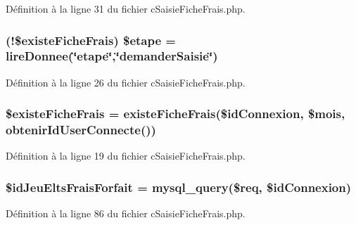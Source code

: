 Définition à la ligne 31 du fichier c\-Saisie\-Fiche\-Frais.\-php.

\hypertarget{c_saisie_fiche_frais_8php_af8e2930c82415b5ec01ec03bea717bf3}{
\subsubsection[{\$etape}]{ (!\${\bf existe\-Fiche\-Frais}) \$etape = {\bf lire\-Donnee}(\char`\"{}etape\char`\"{},\char`\"{}demander\-Saisie\char`\"{})}}\label{c_saisie_fiche_frais_8php_af8e2930c82415b5ec01ec03bea717bf3}


Définition à la ligne 26 du fichier c\-Saisie\-Fiche\-Frais.\-php.

\hypertarget{c_saisie_fiche_frais_8php_aa264670a6cc65a3efa2cd5387517ac2b}{
\subsubsection[{\$existe\-Fiche\-Frais}]{\setlength{\rightskip}{0pt plus 5cm}\${\bf existe\-Fiche\-Frais} = {\bf existe\-Fiche\-Frais}(\$id\-Connexion, \$mois, {\bf obtenir\-Id\-User\-Connecte}())}}\label{c_saisie_fiche_frais_8php_aa264670a6cc65a3efa2cd5387517ac2b}


Définition à la ligne 19 du fichier c\-Saisie\-Fiche\-Frais.\-php.

\hypertarget{c_saisie_fiche_frais_8php_a146da22ba279c9539211eb2c6c95fac2}{
\subsubsection[{\$id\-Jeu\-Elts\-Frais\-Forfait}]{\setlength{\rightskip}{0pt plus 5cm}\$id\-Jeu\-Elts\-Frais\-Forfait = mysql\-\_\-query(\$req, \$id\-Connexion)}}\label{c_saisie_fiche_frais_8php_a146da22ba279c9539211eb2c6c95fac2}


Définition à la ligne 86 du fichier c\-Saisie\-Fiche\-Frais.\-php.

